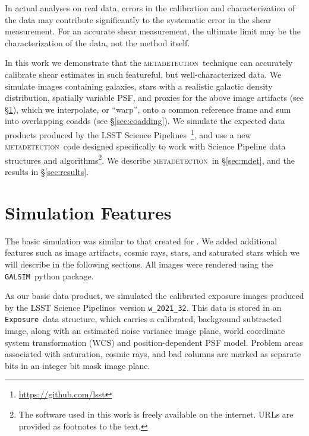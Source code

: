 \documentclass[twocolumn,twocolappendix,astrosym]{openjournal}
\newcommand{\galsim}{\texttt{GALSIM}}
\newcommand{\calexp}{\texttt{Exposure}}
\newcommand{\dm}{LSST Science Pipelines}
\newcommand{\mdet}{\textsc{metadetection}}
\begin{document}
In actual analyses on real data, errors in the calibration and characterization
of the data may contribute significantly to the systematic error in the shear
measurement.  For an accurate shear measurement, the ultimate limit may be the
characterization of the data, not the method itself.

In this work we demonstrate that the \mdet\ technique can accurately calibrate
shear estimates in such featureful, but well-characterized data.  We simulate
images containing galaxies, stars with a realistic galactic density
distribution, spatially variable PSF, and proxies for the above image artifacts
(see \S \ref{sec:sim}), which we interpolate, or ``warp'', onto a common
reference frame and sum into overlapping coadds (see \S \ref{sec:coadding}).
We simulate the expected data products produced by the \dm\
\citep{BoschLSST2019,BoschHSC2017}\footnote{\url{https://github.com/lsst}}, and
use a new \mdet\ code designed specifically to work with Science Pipeline data
structures and algorithms\footnote{The software used in this work is freely
available on the internet.  URLs are provided as footnotes to the text.}.  We
describe \mdet\ in \S \ref{sec:mdet}, and the results in \S \ref{sec:results}.

\section{Simulation Features} \label{sec:sim}

The basic simulation was similar to that created for \citep{mdet20}.  We added
additional features such as image artifacts, cosmic rays, stars, and saturated
stars which we will describe in the following sections.  All images were
rendered using the \galsim\ python package.

As our basic data product, we simulated the calibrated exposure images produced
by the \dm\ version \texttt{w\_2021\_32}.  This data is stored in an \calexp\
data structure, which carries a calibrated, background subtracted image, along
with an estimated noise variance image plane, world coordinate system
transformation (WCS) and position-dependent PSF model.  Problem areas
associated with saturation, cosmic rays, and bad columns are marked as separate
bits in an integer bit mask image plane.

\end{document}
